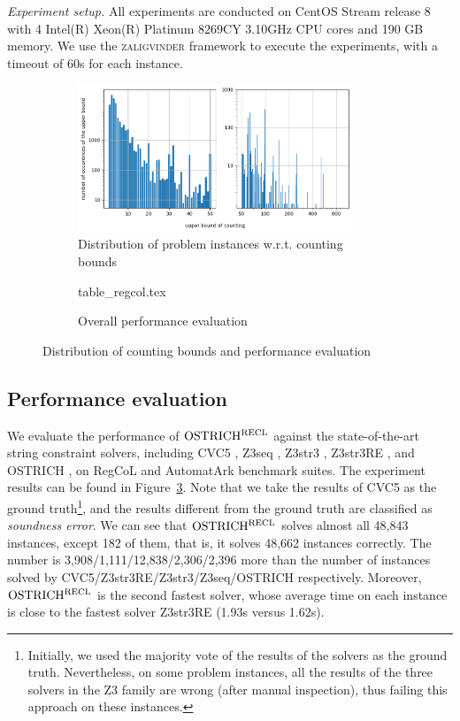 \medskip
\noindent
\emph{Experiment setup.}
All experiments are conducted on CentOS Stream release 8 with 4 Intel(R) Xeon(R) Platinum 8269CY 3.10GHz CPU cores and 190 GB memory. We use the \textsc{zaligvinder} framework \cite{zaligvinder_2021} to execute the experiments, with a timeout of 60s for each instance.


%
\begin{figure}[ht]
  \centering
  \begin{subfigure}[t]{0.49\textwidth}
    \centering\vskip 0pt
    \includegraphics[width=0.9\textwidth]{counting_distribution.png}  
    \caption{Distribution of problem instances w.r.t. counting bounds}  
    \label{fig:count_distri}
  \end{subfigure}
  \hfill
  \begin{subfigure}[t]{0.49\textwidth}
    \centering\vskip 0pt
      {table_regcol.tex}
      \caption{Overall performance evaluation}
    \label{fig:table_overall_eval}
  \end{subfigure}
  \caption{Distribution of counting bounds and performance evaluation}
\end{figure}

\subsection{Performance evaluation}\label{subsec:overall_eval}

We evaluate the performance of $\rm OSTRICH^{RECL}$ against the state-of-the-art string constraint solvers, including CVC5
\cite{cvc5}, Z3seq \cite{z3seq}, Z3str3
\cite{Z3-str3}, Z3str3RE \cite{BD+23}, and OSTRICH
\cite{CHL+19}, on RegCoL and AutomatArk benchmark suites.
The experiment results can be found in Figure~\ref{fig:table_overall_eval}. Note that we take the results of CVC5 as the ground truth\footnote{Initially,  we used the majority vote of the results of the solvers as the ground truth. Nevertheless, on some problem instances, all the results of the three solvers in the Z3 family are wrong (after manual inspection), thus failing this approach on these instances.}, and the results different from the ground truth are classified as \emph{soundness error}. We can see that $\rm OSTRICH^{RECL}$ solves almost all 48,843 instances, except 182 of them, that is, it solves 48,662 instances correctly. The number is 3,908/1,111/12,838/2,306/2,396 more than the number of instances solved by CVC5/Z3str3RE/Z3str3/Z3seq/OSTRICH respectively.
%
Moreover, $\rm OSTRICH^{RECL}$ is the second fastest solver, whose average time on each instance is close to the fastest solver Z3str3RE (1.93s versus 1.62s). 

